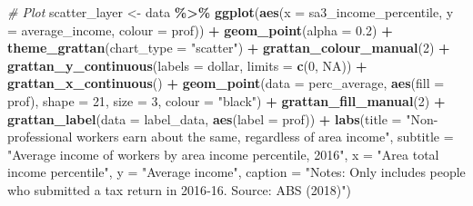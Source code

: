 \documentclass[
]{book}
\newenvironment{Shaded}{\begin{snugshade}}{\end{snugshade}}
\newcommand{\CommentTok}[1]{\textcolor[rgb]{0.56,0.35,0.01}{\textit{#1}}}
\newcommand{\DataTypeTok}[1]{\textcolor[rgb]{0.13,0.29,0.53}{#1}}
\newcommand{\DecValTok}[1]{\textcolor[rgb]{0.00,0.00,0.81}{#1}}
\newcommand{\FloatTok}[1]{\textcolor[rgb]{0.00,0.00,0.81}{#1}}
\newcommand{\KeywordTok}[1]{\textcolor[rgb]{0.13,0.29,0.53}{\textbf{#1}}}
\newcommand{\NormalTok}[1]{#1}
\newcommand{\OperatorTok}[1]{\textcolor[rgb]{0.81,0.36,0.00}{\textbf{#1}}}
\newcommand{\OtherTok}[1]{\textcolor[rgb]{0.56,0.35,0.01}{#1}}
\newcommand{\StringTok}[1]{\textcolor[rgb]{0.31,0.60,0.02}{#1}}
\begin{document}
\begin{Shaded}
\begin{Highlighting}[]
\CommentTok{\# Plot }
\NormalTok{scatter\_layer \textless{}{-}}\StringTok{ }\NormalTok{data }\OperatorTok{\%\textgreater{}\%}\StringTok{ }
\StringTok{  }\KeywordTok{ggplot}\NormalTok{(}\KeywordTok{aes}\NormalTok{(}\DataTypeTok{x =}\NormalTok{ sa3\_income\_percentile,}
             \DataTypeTok{y =}\NormalTok{ average\_income,}
             \DataTypeTok{colour =}\NormalTok{ prof)) }\OperatorTok{+}
\StringTok{  }\KeywordTok{geom\_point}\NormalTok{(}\DataTypeTok{alpha =} \FloatTok{0.2}\NormalTok{) }\OperatorTok{+}\StringTok{ }
\StringTok{  }\KeywordTok{theme\_grattan}\NormalTok{(}\DataTypeTok{chart\_type =} \StringTok{"scatter"}\NormalTok{) }\OperatorTok{+}\StringTok{ }
\StringTok{  }\KeywordTok{grattan\_colour\_manual}\NormalTok{(}\DecValTok{2}\NormalTok{) }\OperatorTok{+}\StringTok{ }
\StringTok{  }\KeywordTok{grattan\_y\_continuous}\NormalTok{(}\DataTypeTok{labels =}\NormalTok{ dollar, }
                       \DataTypeTok{limits =} \KeywordTok{c}\NormalTok{(}\DecValTok{0}\NormalTok{, }\OtherTok{NA}\NormalTok{)) }\OperatorTok{+}\StringTok{ }
\StringTok{  }\KeywordTok{grattan\_x\_continuous}\NormalTok{() }\OperatorTok{+}\StringTok{ }
\StringTok{  }\KeywordTok{geom\_point}\NormalTok{(}\DataTypeTok{data =}\NormalTok{ perc\_average,}
             \KeywordTok{aes}\NormalTok{(}\DataTypeTok{fill =}\NormalTok{ prof),}
             \DataTypeTok{shape =} \DecValTok{21}\NormalTok{,}
             \DataTypeTok{size =} \DecValTok{3}\NormalTok{, }
             \DataTypeTok{colour =} \StringTok{"black"}\NormalTok{) }\OperatorTok{+}\StringTok{ }
\StringTok{  }\KeywordTok{grattan\_fill\_manual}\NormalTok{(}\DecValTok{2}\NormalTok{) }\OperatorTok{+}\StringTok{ }
\StringTok{  }\KeywordTok{grattan\_label}\NormalTok{(}\DataTypeTok{data =}\NormalTok{ label\_data,}
                \KeywordTok{aes}\NormalTok{(}\DataTypeTok{label =}\NormalTok{ prof)) }\OperatorTok{+}\StringTok{ }
\StringTok{  }\KeywordTok{labs}\NormalTok{(}\DataTypeTok{title =} \StringTok{"Non{-}professional workers earn about the same, regardless of area income"}\NormalTok{,}
       \DataTypeTok{subtitle =} \StringTok{"Average income of workers by area income percentile, 2016"}\NormalTok{,}
       \DataTypeTok{x =} \StringTok{"Area total income percentile"}\NormalTok{,}
       \DataTypeTok{y =} \StringTok{"Average income"}\NormalTok{,}
       \DataTypeTok{caption =} \StringTok{"Notes: Only includes people who submitted a tax return in 2016{-}16. Source: ABS (2018)"}\NormalTok{)}
\end{Highlighting}
\end{Shaded}
\end{document}
